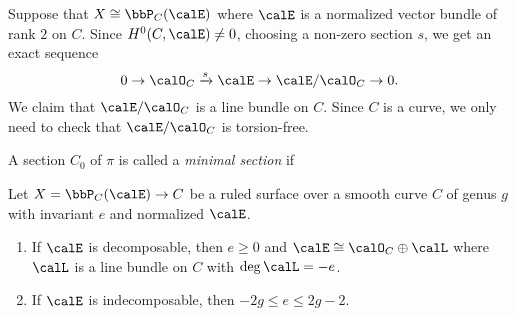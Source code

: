    Suppose that \(X \cong \bbP_C(\calE)\) where \(\calE\) is a normalized vector bundle of rank \(2\) on \(C\).
    Since \(H^0(C,\calE) \neq 0\), choosing a non-zero section \(s\), we get an exact sequence
    \[ 0 \to \calO_C \xrightarrow{s} \calE \to \calE/\calO_C \to 0. \]
    We claim that \(\calE/\calO_C\) is a line bundle on \(C\).
    Since \(C\) is a curve, we only need to check that \(\calE/\calO_C\) is torsion-free.


    \begin{definition}\label{def:minimal_section_of_ruled_surface}
        A section \(C_0\) of \(\pi\) is called a \emph{minimal section} if 
    \end{definition}

    \begin{lemma}\label{lem:restriction_of_e}
        Let \(X=\bbP_C(\calE) \to C\) be a ruled surface over a smooth curve \(C\) of genus \(g\) with invariant \(e\) and normalized \(\calE\). 
        \begin{enumerate}
            \item If \(\calE\) is decomposable, then \(e \geq 0\) and \(\calE \cong \calO_C \oplus \calL\) where \(\calL\) is a line bundle on \(C\) with \(\deg \calL = -e\).
            \item If \(\calE\) is indecomposable, then \(-2g \leq e \leq 2g - 2\).
        \end{enumerate} 
    \end{lemma}
